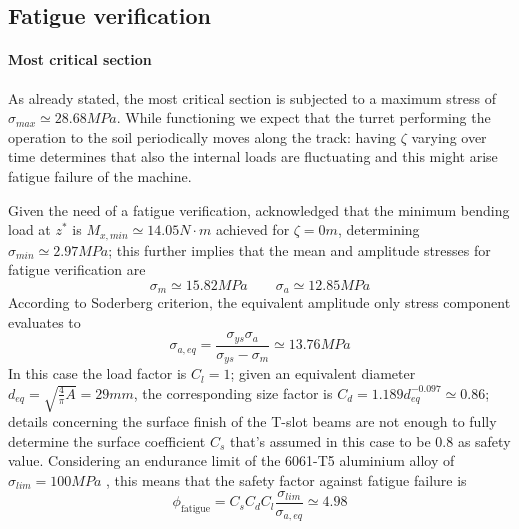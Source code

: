 \subsection{Fatigue verification}
	\paragraph{Most critical section} As already stated, the most critical section is subjected to a maximum stress of $\sigma_{max} \simeq 28.68MPa$. While functioning we expect that the turret performing the operation to the soil periodically moves along the track: having $\zeta$ varying over time determines that also the internal loads are fluctuating and this might arise fatigue failure of the machine.
	
	Given the need of a fatigue verification, acknowledged that the minimum bending load at $z^*$ is $M_{x,min} \simeq 14.05N\cdot m$ achieved for $\zeta = 0m$, determining $\sigma_{min} \simeq 2.97MPa$; this further implies that the mean and amplitude stresses for fatigue verification are
	\[ \sigma_m \simeq 15.82 MPa \qquad \sigma_a \simeq 12.85MPa \]
	According to Soderberg criterion, the equivalent amplitude only stress component evaluates to
	\[ \sigma_{a,eq} = \frac{\sigma_{ys} \sigma_a}{\sigma_{ys} - \sigma_m} \simeq 13.76MPa  \] 
	In this case the load factor is $C_l=1$; given an equivalent diameter $d_{eq} = \sqrt{\frac 4\pi A} = 29mm$, the corresponding size factor is $C_d = 1.189d_{eq}^{-0.097} \simeq 0.86$; details concerning the surface finish of the T-slot beams are not enough to fully determine the surface coefficient $C_s$ that's assumed in this case to be $0.8$ as safety value. Considering an endurance limit of the 6061-T5 aluminium alloy of $\sigma_{lim} = 100MPa$ \cite{aluminium-endurance}, this means that the safety factor against fatigue failure is
	\[ \phi_\textrm{fatigue} = C_sC_dC_l\frac{\sigma_{lim}}{\sigma_{a,eq}} \simeq 4.98 \]